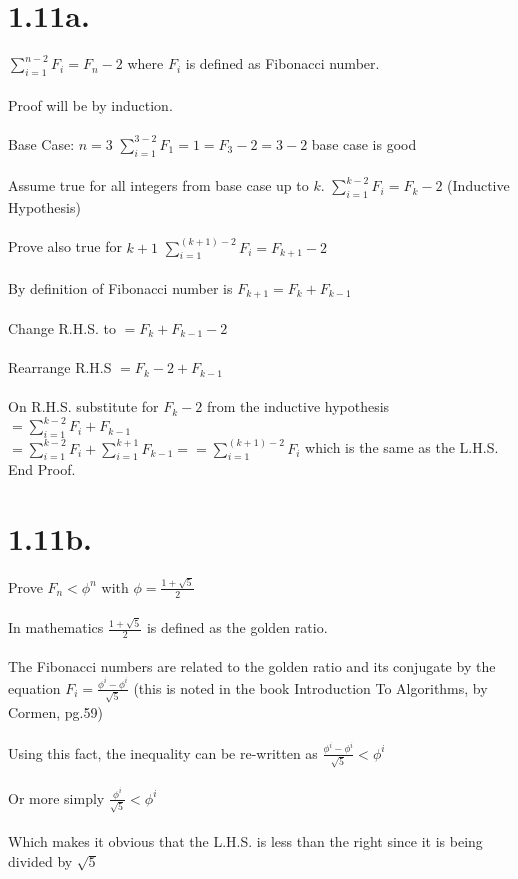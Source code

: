 \documentclass[12pt,letterpaper]{article}
\begin{document}
\section*{1.11a.}
$\displaystyle \sum_{i=1}^{n-2}F_{i} = F_{n} - 2$ where $F_{i}$ is defined as Fibonacci number.\\\\
Proof will be by induction.\\\\
Base Case: $n=3$ \hspace*{.5 cm} $\sum_{i=1}^{3-2}F_{1} = 1 = F_{3} - 2 = 3 - 2$ base case is good\\\\
Assume true for all integers from base case up to $k$. $\displaystyle \sum_{i=1}^{k-2}F_{i} = F_{k} - 2$ \tiny{(Inductive Hypothesis)}\small\\\\
Prove also true for $k + 1$ \hspace*{.5 cm} $\displaystyle \sum_{i=1}^{(k + 1)-2}F_{i} = F_{k + 1} - 2$\\\\
By definition of Fibonacci number is $F_{k + 1} = F_{k} + F_{k - 1}$\\\\
Change R.H.S. to $= F_{k} + F_{k - 1} - 2$\\\\
Rearrange R.H.S $= F_{k} - 2 + F_{k - 1}$\\\\
On R.H.S. substitute for $F_{k} - 2$ from the inductive hypothesis $\displaystyle = \sum_{i=1}^{k-2}F_{i} + F_{k - 1}$\\
$\displaystyle = \sum_{i=1}^{k-2}F_{i} + \sum_{i=1}^{k+1}F_{k-1} = \displaystyle = \sum_{i=1}^{(k+1)-2}F_{i}$ which is the same as the L.H.S. End Proof.
\newpage
\section*{1.11b.}
Prove $\displaystyle F_{n} < \phi^n$ with $\phi = \frac{1 + \sqrt{5}}{2}$\\\\
In mathematics $\displaystyle \frac{1 + \sqrt{5}}{2}$ is defined as the golden ratio.\\\\
The Fibonacci numbers are related to the golden ratio and its conjugate by the equation $\displaystyle F_{i} = \frac{\phi^i - \phi^i}{\sqrt{5}}$ \scriptsize (this is noted in the book Introduction To Algorithms, by Cormen, pg.59)\small\\\\
Using this fact, the inequality can be re-written as $\displaystyle \frac{\phi^i - \phi^i}{\sqrt{5}} < \phi^{i}$\\\\
Or more simply $\displaystyle \frac{\phi^i}{\sqrt{5}} < \phi^{i}$\\\\
Which makes it obvious that the L.H.S. is less than the right since it is being divided by $\sqrt{5}$
\end{document}
